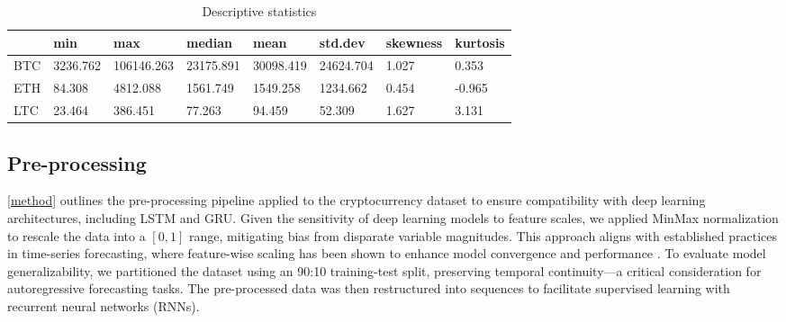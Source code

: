 \documentclass{dsfe}
\begin{document}
\begin{table}[ht]
\centering
\begin{tabular}{llllllll}
  \hline
 & min & max & median & mean & std.dev & skewness & kurtosis \\ 
  \hline
BTC & 3236.762 & 106146.263 & 23175.891 & 30098.419 & 24624.704 & 1.027 & 0.353 \\ 
  ETH & 84.308 & 4812.088 & 1561.749 & 1549.258 & 1234.662 & 0.454 & -0.965 \\ 
  LTC & 23.464 & 386.451 & 77.263 & 94.459 & 52.309 & 1.627 & 3.131 \\ 
   \hline
\end{tabular}
\caption{Descriptive statistics} 
\label{statDes}
\end{table}
\subsection{Pre-processing}
\autoref{method} outlines the pre-processing pipeline applied to the cryptocurrency dataset to ensure compatibility with deep learning architectures, including LSTM and GRU.  Given the sensitivity of deep learning models to feature scales, we applied MinMax normalization to rescale the data into a $[0, 1]$ range, mitigating bias from disparate variable magnitudes. This approach aligns with established practices in time-series forecasting, where feature-wise scaling has been shown to enhance model convergence and performance \citep{ahsan2021}.
To evaluate model generalizability, we partitioned the dataset using an 90:10 training-test split, preserving temporal continuity—a critical consideration for autoregressive forecasting tasks. The pre-processed data was then restructured into sequences to facilitate supervised learning with recurrent neural networks (RNNs).
\end{document}
